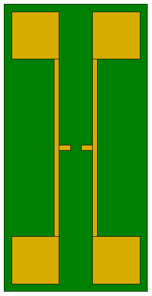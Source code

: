 \begin{figure}[!]
    \centering
    \begin{minipage}{0.75\textwidth} 
        \centering
        \begin{subfigure}[t]{0.45\textwidth}
            \centering
            \includegraphics[height=0.32\textheight]{figures/typ_PCA_antenna.pdf}
            \caption{\centering}
            \label{fig:typPCAantenna}
        \end{subfigure}
        \hfill
        \begin{subfigure}[t]{0.45\textwidth}
            \centering

\end{subfigure}
\end{minipage}
\end{figure}
